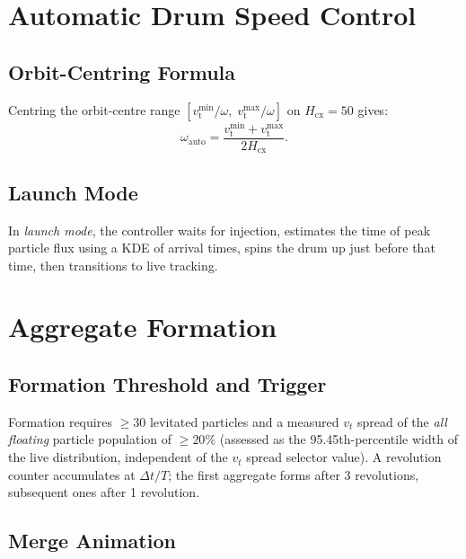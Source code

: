 \documentclass[12pt, a4paper]{article}
\newcommand{\vt}{v_{\mathrm{t}}}
\newcommand{\Hcx}{H_{\mathrm{cx}}}
\newcommand{\omg}{\omega}
\begin{document}
\section{Automatic Drum Speed Control}

\subsection{Orbit-Centring Formula}

Centring the orbit-centre range $[\vt^{\min}/\omg,\; \vt^{\max}/\omg]$
on $\Hcx = 50$ gives:
\begin{equation}
  \boxed{\omg_{\mathrm{auto}} = \frac{\vt^{\min} + \vt^{\max}}{2 \Hcx}.}
  \label{eq:auto_omega}
\end{equation}

\subsection{Launch Mode}

In \emph{launch mode}, the controller waits for injection, estimates the time
of peak particle flux using a KDE of arrival times, spins the drum up just
before that time, then transitions to live tracking.

\section{Aggregate Formation}

\subsection{Formation Threshold and Trigger}

Formation requires $\geq 30$ levitated particles and a measured
$v_t$ spread of the \emph{all floating} particle population of
$\geq 20\%$ (assessed as the 95.45th-percentile width of the live
distribution, independent of the $v_t$ spread selector value).
A revolution counter accumulates at $\Delta t / T$; the first aggregate forms
after 3 revolutions, subsequent ones after 1 revolution.

\subsection{Merge Animation}
\end{document}
